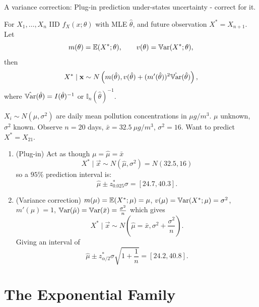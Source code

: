 \documentclass[10pt, a4paper]{article}
\begin{document}
A variance correction:
Plug-in prediction under-states uncertainty -
correct for it.

\begin{proposition}
    For $X_1, \dotsc, X_n$ IID $f_{X}(x; \theta)$ with MLE $\hat{\theta}$,
    and future observation $X ^ {*} = X_{n + 1}$.
    Let
    \[
    m(\theta) = \mathbb{E}(X ^ {*}; \theta),\qquad v(\theta) = \mathbb{V}\mathrm{ar}(X ^ {*}; \theta),
    \]
    then
    \[
    X ^ {*} \mid \mathbf{x} \sim N\left(m(\hat{\theta}), v(\hat{\theta}) + (m'(\hat{\theta})) ^ 2\hat{\mathbb{V}\mathrm{ar}}(\hat{\theta})\right),
    \]
    where $\hat{\mathbb{V}\mathrm{ar}}(\hat{\theta}) = I(\hat{\theta}) ^ {-1}$ or $\mathbb{I}_n(\hat{\theta}) ^ {-1}$.
\end{proposition}

\begin{example}
    $X_i \sim N(\mu, \sigma ^ 2)$ are daily mean pollution concentrations in $\mu g/m ^ 3$.
    $\mu$ unknown,
    $\sigma ^ 2$ known.
    Observe $n = 20$ days,
    $\bar{x} = 32.5\ \mu g/m ^ 3$,
    $\sigma ^ 2 = 16$.
    Want to predict $X ^ {*} = X_{21}$.

    \begin{solution}
        \begin{enumerate}[label = (\arabic*)]
            \item (Plug-in)
            Act as though $\mu = \hat{\mu} = \bar{x}$
            \[
            X ^ {*} \mid \vec{x} \sim N(\hat{\mu}, \sigma ^ 2) = N(32.5, 16)
            \]
            so a $95\%$ prediction interval is:
            \[
            \hat{\mu} \pm z_{0.025}^{*}\sigma = [24.7, 40.3].
            \]

            \item (Variance correction)
            $m(\mu) = \mathbb{E}(X ^ {*}; \mu) = \mu$,
            $v(\mu) = \mathbb{V}\mathrm{ar}(X ^ {*}; \mu) = \sigma ^ 2$,
            $m'(\mu) = 1$,
            $\mathbb{V}\mathrm{ar}(\hat{\mu}) = \mathbb{V}\mathrm{ar}(\bar{x}) = \frac{\sigma ^ 2}{n}$ which gives
            \[
            X ^ {*} \mid \vec{x} \sim N\left(\hat{\mu} = \bar{x}, \sigma ^ 2 + \frac{\sigma ^ 2}{n}\right).
            \]
            Giving an interval of
            \[
            \hat{\mu} \pm z_{\alpha / 2}^{*}\sigma\sqrt{1 + \frac{1}{n}} = [24.2, 40.8].
            \]
        \end{enumerate}
    \end{solution}
\end{example}

\newpage

\section{The Exponential Family}
\end{document}
